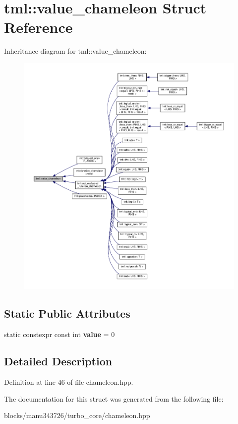 \hypertarget{structtml_1_1value__chameleon}{\section{tml\+:\+:value\+\_\+chameleon Struct Reference}
\label{structtml_1_1value__chameleon}
}


Inheritance diagram for tml\+:\+:value\+\_\+chameleon\+:
\nopagebreak
\begin{figure}[H]
\begin{center}
\leavevmode
\includegraphics[width=350pt]{structtml_1_1value__chameleon__inherit__graph}
\end{center}
\end{figure}
\subsection*{Static Public Attributes}
\begin{DoxyCompactItemize}
\item 
\hypertarget{structtml_1_1value__chameleon_aac09cd540b6675de3dbba50b55e8c98e}{static constexpr const int {\bfseries value} = 0}\label{structtml_1_1value__chameleon_aac09cd540b6675de3dbba50b55e8c98e}

\end{DoxyCompactItemize}


\subsection{Detailed Description}


Definition at line 46 of file chameleon.\+hpp.



The documentation for this struct was generated from the following file\+:\begin{DoxyCompactItemize}
\item 
blocks/manu343726/turbo\+\_\+core/chameleon.\+hpp\end{DoxyCompactItemize}
